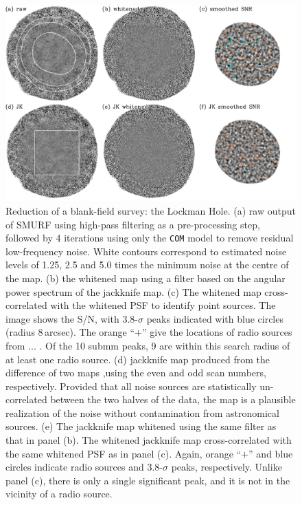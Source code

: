 \documentclass[useAMS,usenatbib,nofootinbib]{mn2e}
\newcommand{\model}[1]{\texttt{#1}}
\begin{document}
\begin{figure}
\centering
\includegraphics[width=\linewidth]{lockman_maps.pdf}
\caption{Reduction of a blank-field survey: the Lockman Hole. (a) raw
  output of SMURF using high-pass filtering as a pre-processing step,
  followed by 4 iterations using only the \model{COM} model to remove
  residual low-frequency noise. White contours correspond to estimated
  noise levels of 1.25, 2.5 and 5.0 times the minimum noise at the
  centre of the map. (b) the whitened map using a filter based on the
  angular power spectrum of the jackknife map. (c) The whitened map
  cross-correlated with the whitened PSF to identify point
  sources. The image shows the S/N, with 3.8-$\sigma$ peaks indicated
  with blue circles (radius 8\,arcsec). The orange ``$+$'' give the
  locations of radio sources from ... . Of the 10 submm peaks, 9 are
  within this search radius of at least one radio source. (d)
  jackknife map produced from the difference of two maps ,using the
  even and odd scan numbers, respectively. Provided that all noise
  sources are statistically un-correlated between the two halves of
  the data, the map is a plausible realization of the noise without
  contamination from astronomical sources. (e) The jackknife map
  whitened using the same filter as that in panel (b). The whitened
  jackknife map cross-correlated with the same whitened PSF as in
  panel (c). Again, orange ``$+$'' and blue circles indicate radio
  sources and 3.8-$\sigma$ peaks, respectively. Unlike panel (c),
  there is only a single significant peak, and it is not in the
  vicinity of a radio source.}
\label{fig:lockman_maps}
\end{figure}
\end{document}
